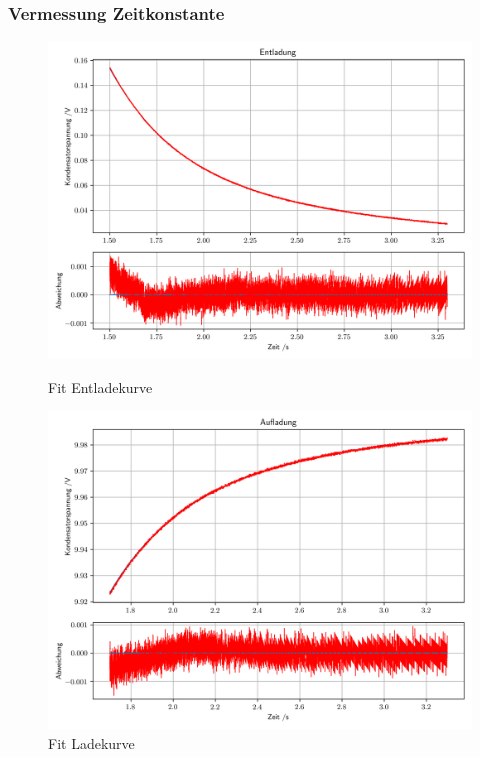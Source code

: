 \documentclass[12pt,twoside,a4paper]{scrartcl}
\begin{document}
		\subsubsection{Vermessung Zeitkonstante}
		\label{Daten::Kondensator}
			\begin{figure}[H]
				\centering
				\begin{minipage}{0.49 \textwidth}
						\includegraphics[width = \textwidth]{Plots/Capacitor/CapacitorEntladung}
				\caption{Fit Entladekurve}
				\end{minipage}
				\begin{minipage}{0.49 \textwidth}
						\includegraphics[width = \textwidth]{Plots/Capacitor/CapacitorAufladung}
				\caption{Fit Ladekurve}
				\end{minipage}
			\end{figure}
\end{document}
